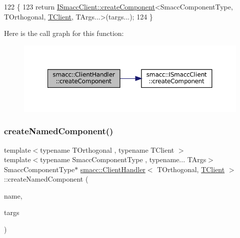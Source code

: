 \begin{DoxyCode}
122     \{
123         \textcolor{keywordflow}{return} \hyperlink{classsmacc_1_1ISmaccClient_a5c1c8eb5e91a3b399662a52cb0ca86aa}{ISmaccClient::createComponent}<SmaccComponentType, TOrthogonal, 
      \hyperlink{classTClient}{TClient}, TArgs...>(targs...);
124     \}
\end{DoxyCode}
Here is the call graph for this function\+:
\nopagebreak
\begin{figure}[H]
\begin{center}
\leavevmode
\includegraphics[width=350pt]{classsmacc_1_1ClientHandler_a4a9adad4c37104586c9b595d9030bb3c_cgraph}
\end{center}
\end{figure}
\mbox{\label{classsmacc_1_1ClientHandler_a33f440a8e06038df0dd291d2ea278f39}} 
\subsubsection{\texorpdfstring{create\+Named\+Component()}{createNamedComponent()}}
{\footnotesize\ttfamily template$<$typename T\+Orthogonal , typename T\+Client $>$ \\
template$<$typename Smacc\+Component\+Type , typename... T\+Args$>$ \\
Smacc\+Component\+Type$\ast$ \hyperlink{classsmacc_1_1ClientHandler}{smacc\+::\+Client\+Handler}$<$ T\+Orthogonal, \hyperlink{classTClient}{T\+Client} $>$\+::create\+Named\+Component (\begin{DoxyParamCaption}\item[{std\+::string}]{name,  }\item[{T\+Args...}]{targs }\end{DoxyParamCaption})\hspace{0.3cm}{\ttfamily [inline]}}




